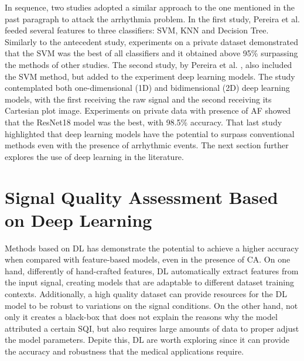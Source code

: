 In sequence, two studies adopted a similar approach to the one mentioned in the past paragraph to attack the arrhythmia problem. In the first study, Pereira et al. \cite{arrhythmia-3} feeded several features to three classifiers: \gls{SVM}, \gls{KNN} and Decision Tree. Similarly to the antecedent study, experiments on a private dataset demonstrated that the \gls{SVM} was the best of all classifiers and it obtained above 95\% surpassing the methods of other studies. The second study, by Pereira et al. \cite{arrhythmia-4}, also included the \gls{SVM} method, but added to the experiment deep learning models. The study contemplated both one-dimensional (1D) and bidimensional (2D) deep learning models, with the first receiving the raw signal and the second receiving its Cartesian plot image. Experiments on private data with presence of \gls{AF} showed that the ResNet18 model was the best, with 98.5\% accuracy. That last study highlighted that deep learning models have the potential to surpass conventional methods even with the presence of arrhythmic events. The next section further explores the use of deep learning in the literature.  

\section{Signal Quality Assessment Based on Deep Learning}
\label{sec:deep_learning}

Methods based on \gls{DL} has demonstrate the potential to achieve a higher accuracy when compared with feature-based models, even in the presence of \gls{CA}. On one hand, differently of hand-crafted features, \gls{DL} automatically extract features from the input signal, creating models that are adaptable to different dataset training contexts. Additionally, a high quality dataset can provide resources for the \gls{DL} model to be robust to variations on the signal conditions. On the other hand, not only it creates a black-box that does not explain the reasons why the model attributed a certain \gls{SQI}, but also requires large amounts of data to proper adjust the model parameters. Depite this, \gls{DL} are worth exploring since it can provide the accuracy and robustness that the medical applications require. 

